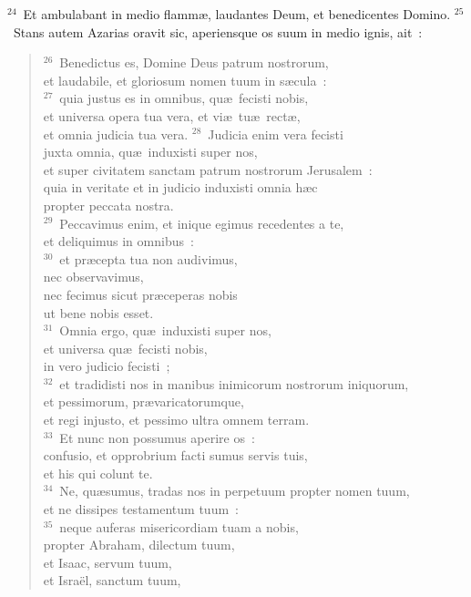 ${}^{24}$~Et ambulabant in medio flamm\ae , laudantes Deum, et benedicentes Domino.
${}^{25}$~Stans autem Azarias oravit sic, aperiensque os suum in medio ignis, ait~:
\begin{flushleft}\begin{verse}${}^{26}$~Benedictus es, Domine Deus patrum nostrorum,\\ et laudabile, et gloriosum nomen tuum in s\ae cula~:\\
${}^{27}$~quia justus es in omnibus, qu\ae\ fecisti nobis,\\ et universa opera tua vera, et vi\ae\ tu\ae\ rect\ae ,\\ et omnia judicia tua vera.
${}^{28}$~Judicia enim vera fecisti\\ juxta omnia, qu\ae\ induxisti super nos,\\ et super civitatem sanctam patrum nostrorum Jerusalem~:\\ quia in veritate et in judicio induxisti omnia h\ae c\\ propter peccata nostra.\\
${}^{29}$~Peccavimus enim, et inique egimus recedentes a te,\\ et deliquimus in omnibus~:\\
${}^{30}$~et pr\ae cepta tua non audivimus,\\ nec observavimus,\\ nec fecimus sicut pr\ae ceperas nobis\\ ut bene nobis esset.\\
${}^{31}$~Omnia ergo, qu\ae\ induxisti super nos,\\ et universa qu\ae\ fecisti nobis,\\ in vero judicio fecisti~;\\
${}^{32}$~et tradidisti nos in manibus inimicorum nostrorum iniquorum,\\ et pessimorum, pr\ae varicatorumque,\\ et regi injusto, et pessimo ultra omnem terram.\\
${}^{33}$~Et nunc non possumus aperire os~:\\ confusio, et opprobrium facti sumus servis tuis,\\ et his qui colunt te.\\
${}^{34}$~Ne, qu\ae sumus, tradas nos in perpetuum propter nomen tuum,\\ et ne dissipes testamentum tuum~:\\
${}^{35}$~neque auferas misericordiam tuam a nobis,\\ propter Abraham, dilectum tuum,\\ et Isaac, servum tuum,\\ et Isra\"el, sanctum tuum,\\

\end{verse}
\end{flushleft}
